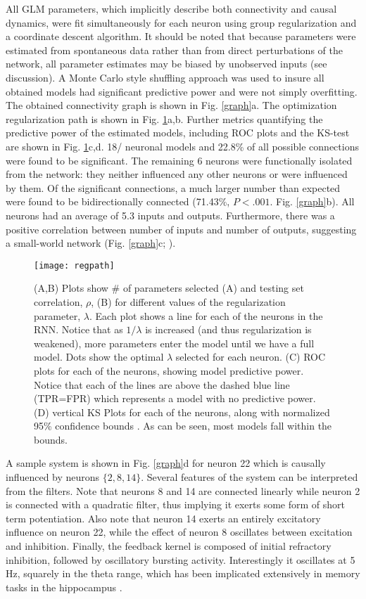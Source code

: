 \documentclass[11pt,a4paper,final]{article}
\begin{document}
All GLM parameters, which implicitly describe both connectivity and causal dynamics, were fit simultaneously for each neuron using group regularization and a coordinate descent algorithm.
It should be noted that because parameters were estimated from spontaneous data rather than from direct perturbations of the network, all parameter estimates may be biased by unobserved inputs (see discussion).
A Monte Carlo style shuffling approach was used to insure all obtained models had significant predictive power and were not simply overfitting.
The obtained connectivity graph is shown in Fig. \ref{graph}a.
The optimization regularization path is shown in Fig. \ref{regpath}a,b.
Further metrics quantifying the predictive power of the estimated models, including ROC plots and the KS-test are shown in Fig. \ref{regpath}c,d.
18/\nn{} neuronal models and 22.8\% of all possible connections were found to be significant.
The remaining 6 neurons were functionally isolated from the network: they neither influenced any other neurons or were influenced by them.
Of the significant connections, a much larger number than expected were found to be bidirectionally connected (71.43\%, $P<.001$. Fig. \ref{graph}b).
All neurons had an average of 5.3 inputs and outputs.
Furthermore, there was a positive correlation between number of inputs and number of outputs, suggesting a small-world network (Fig. \ref{graph}c; \citet{sporns09,fallani14}).

\begin{figure}[!ht]
	\centering
	\texttt{[image: regpath]}
	\caption[Regularization Path]{
		(A,B) Plots show \# of parameters selected (A) and testing set correlation, $\rho$, (B) for different values of the regularization parameter, $\lambda$. Each plot shows a line for each of the \nn{} neurons in the RNN. Notice that as $1/\lambda$ is increased (and thus regularization is weakened), more parameters enter the model until we have a full model. Dots show the optimal $\lambda$ selected for each neuron.
		(C) ROC plots for each of the \nn{} neurons, showing model predictive power. Notice that each of the lines are above the dashed blue line (TPR=FPR) which represents a model with no predictive power.
		(D) vertical KS Plots for each of the \nn{} neurons, along with normalized 95\% confidence bounds \citep{song13sparse}. As can be seen, most models fall within the bounds.}
	\label{regpath}
\end{figure}

A sample system is shown in Fig. \ref{graph}d for neuron 22 which is causally influenced by neurons $\{2,8,14\}$.
Several features of the system can be interpreted from the filters.
Note that neurons 8 and 14 are connected linearly while neuron 2 is connected with a quadratic filter, thus implying it exerts some form of short term potentiation.
Also note that neuron 14 exerts an entirely excitatory influence on neuron 22, while the effect of neuron 8 oscillates between excitation and inhibition.
Finally, the feedback kernel is composed of initial refractory inhibition, followed by oscillatory bursting activity.
Interestingly it oscillates at 5 Hz, squarely in the theta range, which has been implicated extensively in memory tasks in the hippocampus \citep{buzsaki06,sandler14}.
\end{document}
